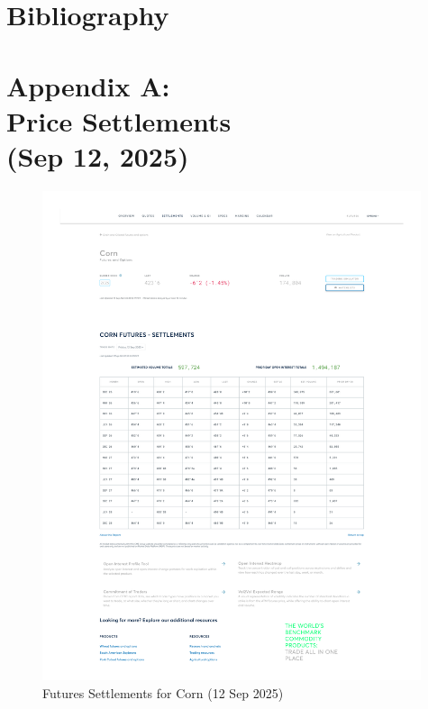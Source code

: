 \documentclass[11pt,a4paper]{article} %
\let\oldsection\section
\renewcommand{\section}{%
    \clearpage
    \thispagestyle{myfancy}%
    \oldsection
  }
\begin{document}
\section{Bibliography}



\section{Appendix A: \\ Price Settlements \\ (Sep 12, 2025)}
\newpage

\begin{figure}[h]
  \centering
  \includegraphics[width=0.99\textwidth]{appendix/CORN12SEP.pdf}
  \caption{Futures Settlements for Corn (12 Sep 2025)}
  \label{fig:corn_settlements}
\end{figure}
\end{document}
